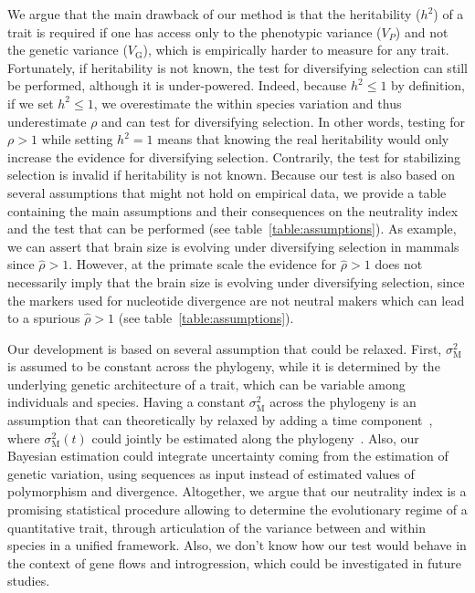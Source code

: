 \documentclass{article}
\newcommand{\Trait}{P}
\newcommand{\Heritability}{h^2}
\newcommand{\VarPhenotype}{V_{\Trait}}
\newcommand{\VarGenetic}{V_{\mathrm{G}}}
\newcommand{\RateMut}{\sigma^2_{\mathrm{M}}}
\newcommand{\NI}{\rho}
\newcommand{\EstNI}{\widehat{\rho}}
\begin{document}
We argue that the main drawback of our method is that the heritability ($\Heritability$) of a trait is required if one has access only to the phenotypic variance ($\VarPhenotype$) and not the genetic variance ($\VarGenetic$), which is empirically harder to measure for any trait.
Fortunately, if heritability is not known, the test for diversifying selection can still be performed, although it is under-powered.
Indeed, because $\Heritability \leq 1$ by definition, if we set $\Heritability \leq 1$, we overestimate the within species variation and thus underestimate $ \NI$ and can test for diversifying selection.
In other words, testing for $\NI > 1$ while setting $\Heritability = 1$ means that knowing the real heritability would only increase the evidence for diversifying selection.
Contrarily, the test for stabilizing selection is invalid if heritability is not known.
Because our test is also based on several assumptions that might not hold on empirical data, we provide a table containing the main assumptions and their consequences on the neutrality index and the test that can be performed (see table~\ref{table:assumptions}).
As example, we can assert that brain size is evolving under diversifying selection in mammals since $\EstNI > 1$.
However, at the primate scale the evidence for $\EstNI > 1$ does not necessarily imply that the brain size is evolving under diversifying selection, since the markers used for nucleotide divergence are not neutral makers which can lead to a spurious $\EstNI > 1$ (see table~\ref{table:assumptions}).

Our development is based on several assumption that could be relaxed.
First, $\RateMut$ is assumed to be constant across the phylogeny, while it is determined by the underlying genetic architecture of a trait, which can be variable among individuals and species.
Having a constant $\RateMut$ across the phylogeny is an assumption that can theoretically by relaxed by adding a time component~\cite{arnold_understanding_2008, hohenlohe_mipod_2008}, where $\RateMut(t)$ could jointly be estimated along the phylogeny~\cite{kostikova_bridging_2016, gaboriau_multiplatform_2020}.
Also, our Bayesian estimation could integrate uncertainty coming from the estimation of genetic variation, using sequences as input instead of estimated values of polymorphism and divergence.
Altogether, we argue that our neutrality index is a promising statistical procedure allowing to determine the evolutionary regime of a quantitative trait, through articulation of the variance between and within species in a unified framework.
Also, we don't know how our test would behave in the context of gene flows and introgression, which could be investigated in future studies.
\end{document}
